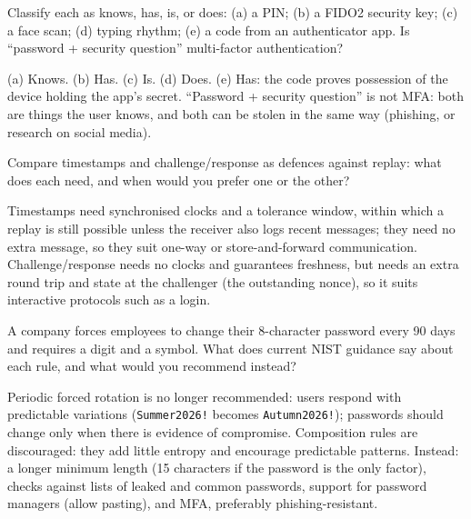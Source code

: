 \begin{exercise}
Classify each as knows, has, is, or does: (a) a PIN; (b) a FIDO2 security key; (c) a face scan; (d) typing rhythm; (e) a code from an authenticator app. Is \enquote{password + security question} multi-factor authentication?
\end{exercise}
\begin{solution}
(a) Knows. (b) Has. (c) Is. (d) Does. (e) Has: the code proves possession of the device holding the app's secret. \enquote{Password + security question} is not MFA: both are things the user knows, and both can be stolen in the same way (phishing, or research on social media).
\end{solution}

\begin{exercise}
Compare timestamps and challenge/response as defences against replay: what does each need, and when would you prefer one or the other?
\end{exercise}
\begin{solution}
Timestamps need synchronised clocks and a tolerance window, within which a replay is still possible unless the receiver also logs recent messages; they need no extra message, so they suit one-way or store-and-forward communication. Challenge/response needs no clocks and guarantees freshness, but needs an extra round trip and state at the challenger (the outstanding nonce), so it suits interactive protocols such as a login.
\end{solution}

\begin{exercise}
A company forces employees to change their 8-character password every 90 days and requires a digit and a symbol. What does current NIST guidance say about each rule, and what would you recommend instead?
\end{exercise}
\begin{solution}
Periodic forced rotation is no longer recommended: users respond with predictable variations (\texttt{Summer2026!} becomes \texttt{Autumn2026!}); passwords should change only when there is evidence of compromise. Composition rules are discouraged: they add little entropy and encourage predictable patterns. Instead: a longer minimum length (15 characters if the password is the only factor), checks against lists of leaked and common passwords, support for password managers (allow pasting), and MFA, preferably phishing-resistant.
\end{solution}

